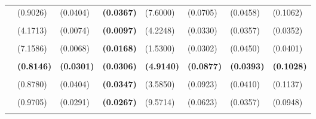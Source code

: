\documentclass[
  12pt,
]{article}
\begin{document}
\begin{table}[H]
{\begin{tabular}[t]{lll>{}lllll}
 & (0.9026) & (0.0404) & \textbf{(0.0367)} & (7.6000) & (0.0705) & (0.0458) & (0.1062)\\
\addlinespace
\cellcolor{gray!6}{c.hamilton28.panel} & \cellcolor{gray!6}{-23.8796} & \cellcolor{gray!6}{0.5309} & \textbf{\cellcolor{gray!6}{0.5267}} & \cellcolor{gray!6}{-0.8265} & \cellcolor{gray!6}{0.6839} & \cellcolor{gray!6}{0.3028} & \cellcolor{gray!6}{0.5615}\\
 & (4.1713) & (0.0074) & \textbf{(0.0097)} & (4.2248) & (0.0330) & (0.0357) & (0.0352)\\
\addlinespace
\cellcolor{gray!6}{c.ma} & \cellcolor{gray!6}{-26.0114} & \cellcolor{gray!6}{0.5466} & \textbf{\cellcolor{gray!6}{0.5244}} & \cellcolor{gray!6}{1.2194} & \cellcolor{gray!6}{0.6885} & \cellcolor{gray!6}{0.3000} & \cellcolor{gray!6}{0.5666}\\
 & (7.1586) & (0.0068) & \textbf{(0.0168)} & (1.5300) & (0.0302) & (0.0450) & (0.0401)\\
\addlinespace
\textbf{\cellcolor{gray!6}{1.sided weighted.cycle}} & \textbf{\cellcolor{gray!6}{1.6191}} & \textbf{\cellcolor{gray!6}{0.4787}} & \textbf{\textbf{\cellcolor{gray!6}{0.5219}}} & \textbf{\cellcolor{gray!6}{1.5348}} & \textbf{\cellcolor{gray!6}{0.6621}} & \textbf{\cellcolor{gray!6}{0.3056}} & \textbf{\cellcolor{gray!6}{0.5400}}\\
\textbf{} & \textbf{(0.8146)} & \textbf{(0.0301)} & \textbf{\textbf{(0.0306)}} & \textbf{(4.9140)} & \textbf{(0.0877)} & \textbf{(0.0393)} & \textbf{(0.1028)}\\
\addlinespace
\cellcolor{gray!6}{c.hamilton13} & \cellcolor{gray!6}{1.6095} & \cellcolor{gray!6}{0.4816} & \textbf{\cellcolor{gray!6}{0.5197}} & \cellcolor{gray!6}{1.7494} & \cellcolor{gray!6}{0.6581} & \cellcolor{gray!6}{0.3111} & \cellcolor{gray!6}{0.5391}\\
 & (0.8780) & (0.0404) & \textbf{(0.0347)} & (3.5850) & (0.0923) & (0.0410) & (0.1137)\\
\addlinespace
\cellcolor{gray!6}{c.quad} & \cellcolor{gray!6}{1.6542} & \cellcolor{gray!6}{0.4498} & \textbf{\cellcolor{gray!6}{0.5040}} & \cellcolor{gray!6}{-8.3825} & \cellcolor{gray!6}{0.7454} & \cellcolor{gray!6}{0.2806} & \cellcolor{gray!6}{0.6389}\\
 & (0.9705) & (0.0291) & \textbf{(0.0267)} & (9.5714) & (0.0623) & (0.0357) & (0.0948)\\
\addlinespace
\cellcolor{gray!6}{c.hamilton13.panel} & \cellcolor{gray!6}{-7.5078} & \cellcolor{gray!6}{0.4985} & \textbf{\cellcolor{gray!6}{0.5037}} & \cellcolor{gray!6}{-0.4802} & \cellcolor{gray!6}{0.7158} & \cellcolor{gray!6}{0.3139} & \cellcolor{gray!6}{0.6119}\\

\end{tabular}}
\end{table}
\end{document}

